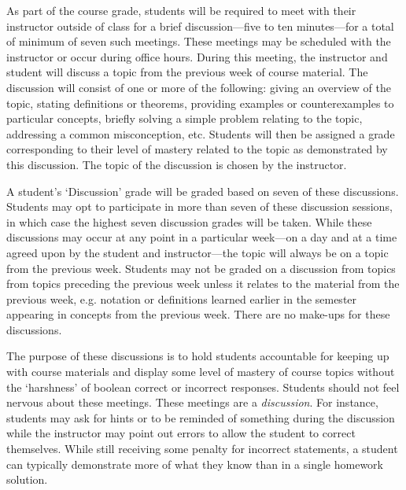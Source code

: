 \documentclass[11pt,letterpaper]{article}
\begin{document}
As part of the course grade, students will be required to meet with their instructor outside of class for a brief discussion---five to ten minutes---for a total of minimum of seven such meetings. These meetings may be scheduled with the instructor or occur during office hours. During this meeting, the instructor and student will discuss a topic from the previous week of course material. The discussion will consist of one or more of the following: giving an overview of the topic, stating definitions or theorems, providing examples or counterexamples to particular concepts, briefly solving a simple problem relating to the topic, addressing a common misconception, etc. Students will then be assigned a grade corresponding to their level of mastery related to the topic as demonstrated by this discussion. The topic of the discussion is chosen by the instructor. \pspace

A student's `Discussion' grade will be graded based on seven of these discussions. Students may opt to participate in more than seven of these discussion sessions, in which case the highest seven discussion grades will be taken. While these discussions may occur at any point in a particular week---on a day and at a time agreed upon by the student and instructor---the topic will always be on a topic from the previous week. Students may not be graded on a discussion from topics from topics preceding the previous week unless it relates to the material from the previous week, e.g. notation or definitions learned earlier in the semester appearing in concepts from the previous week. There are no make-ups for these discussions. \pspace

The purpose of these discussions is to hold students accountable for keeping up with course materials and display some level of mastery of course topics without the `harshness' of boolean correct or incorrect responses. Students should not feel nervous about these meetings. These meetings are a {\itshape discussion}. For instance, students may ask for hints or to be reminded of something during the discussion while the instructor may point out errors to allow the student to correct themselves. While still receiving some penalty for incorrect statements, a student can typically demonstrate more of what they know than in a single homework solution. \pspace
\end{document}
